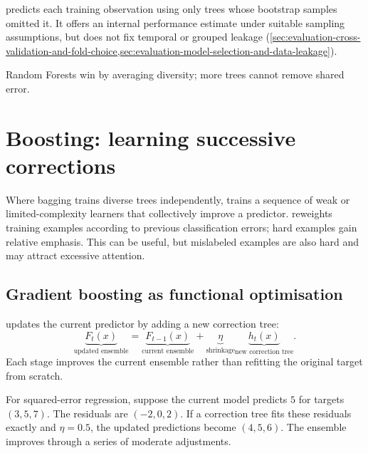  predicts each training observation using only trees whose bootstrap samples omitted it.
It offers an internal performance estimate under suitable sampling assumptions, but does not fix temporal or grouped leakage (\cref{sec:evaluation-cross-validation-and-fold-choice,sec:evaluation-model-selection-and-data-leakage}).

\begin{calloutmemoryhook}
Random Forests win by averaging diversity; more trees cannot remove shared error.
\end{calloutmemoryhook}

\section{Boosting: learning successive corrections}
\label{sec:trees-boosting-learning-successive-corrections}
Where bagging trains diverse trees independently,  trains a sequence of weak or limited-complexity learners that collectively improve a predictor.
 reweights training examples according to previous classification errors; hard examples gain relative emphasis.
This can be useful, but mislabeled examples are also hard and may attract excessive attention.

\subsection{Gradient boosting as functional optimisation}
\label{subsec:trees-gradient-boosting-as-functional-optimisation}
 updates the current predictor by adding a new correction tree:
\begin{equation}
\boxed{
\underbrace{F_t(x)}_{\text{updated ensemble}}
=
\underbrace{F_{t-1}(x)}_{\text{current ensemble}}
+
\underbrace{\eta}_{\text{shrinkage}}
\underbrace{h_t(x)}_{\text{new correction tree}}
}.
\end{equation}
Each stage improves the current ensemble rather than refitting the original target from scratch.

For squared-error regression, suppose the current model predicts $5$ for targets $(3,5,7)$.
The residuals are $(-2,0,2)$.
If a correction tree fits these residuals exactly and $\eta=0.5$, the updated predictions become $(4,5,6)$.
The ensemble improves through a series of moderate adjustments.

